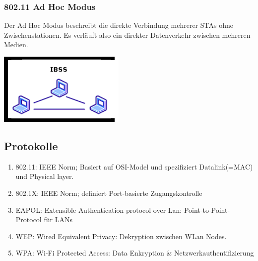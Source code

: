 \documentclass[11pt]{article}
\begin{document}
    \subsubsection{802.11 Ad Hoc Modus}
    \begin{minipage}{0.7\textwidth}     %
        Der Ad Hoc Modus beschreibt die direkte Verbindung mehrerer STAs ohne Zwischenstationen.
        Es verläuft also ein direkter Datenverkehr zwischen mehreren Medien.
    \end{minipage}
    \begin{minipage}{0.3\textwidth}     %
        \includegraphics[width=\linewidth]{802-11_AdHoc.png}
    \end{minipage}

    \subsection{Protokolle}
    \begin{enumerate}[$\diamond$]
        \item 802.11: IEEE Norm; Basiert auf OSI-Model und spezifiziert Datalink(=MAC) und Physical layer.
        \item 802.1X: IEEE Norm; definiert Port-basierte Zugangskontrolle
        \item EAPOL: Extensible Authentication protocol over Lan: Point-to-Point-Protocol für LANs
        \item WEP: Wired Equivalent Privacy: Dekryption zwischen WLan Nodes.
        \item WPA: Wi-Fi Protected Access: Data Enkryption \& Netzwerkauthentifizierung
    \end{enumerate}
\end{document}
